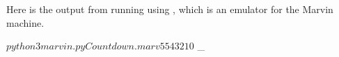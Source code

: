 \documentclass{article}
\begin{document}
\bigskip

\noindent Here is the output from running  using , which is an emulator for the Marvin machine.

\smallskip

\begin{window}
\begin{codeblock}[]{{}}
$ python3 marvin.py Countdown.marv
5
5
4
3
2
1
0
$ _
\end{codeblock}
\end{window}
\end{document}
